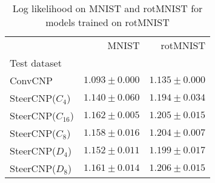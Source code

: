 \begin{table}
\centering
\caption{Log likelihood on MNIST and rotMNIST for models trained on rotMNIST}
\label{tab:mnist_tests}
\begin{tabular}{lrr}
\toprule
{} &                       MNIST &                    rotMNIST \\
Test dataset       &                             &                             \\
\midrule
ConvCNP            &         ${1.093 \pm 0.000}$ &         ${1.135 \pm 0.000}$ \\
SteerCNP($C_4$)    &  $\mathbf{1.140 \pm 0.060}$ &  $\mathbf{1.194 \pm 0.034}$ \\
SteerCNP($C_{16}$) &  $\mathbf{1.162 \pm 0.005}$ &  $\mathbf{1.205 \pm 0.015}$ \\
SteerCNP($C_{8}$)  &  $\mathbf{1.158 \pm 0.016}$ &  $\mathbf{1.204 \pm 0.007}$ \\
SteerCNP($D_4$)    &         ${1.152 \pm 0.011}$ &  $\mathbf{1.199 \pm 0.017}$ \\
SteerCNP($D_8$)    &  $\mathbf{1.161 \pm 0.014}$ &  $\mathbf{1.206 \pm 0.015}$ \\
\bottomrule
\end{tabular}
\end{table}
